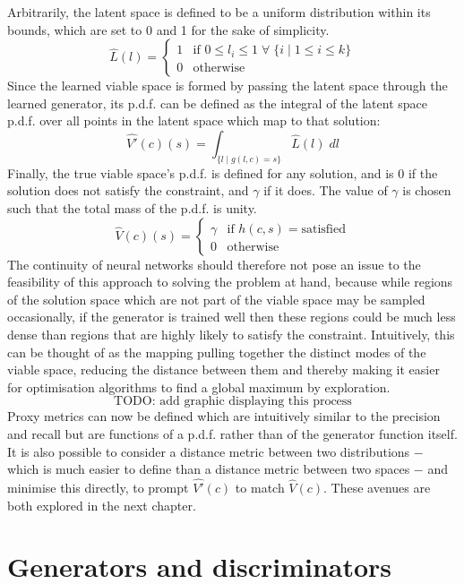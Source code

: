 \documentclass[../../main.tex]{subfiles}
\begin{document}
Arbitrarily, the latent space is defined to be a uniform distribution within its bounds, which are set to 0 and 1 for the sake of simplicity.
$$\hat{L}(l) =
\left\{
	\begin{array}{ll}
		1  & \mbox{if } 0 \le l_i \le 1 \; \forall \; \{i \; | \; 1 \le i \le k\} \\
		0 & \mbox{otherwise}
	\end{array}
\right.$$
Since the learned viable space is formed by passing the latent space through the learned generator, its p.d.f. can be defined as the integral of the latent space p.d.f. over all points in the latent space which map to that solution:
$$\hat{V'}(c)(s) = \int_{\{l \; | \; g(l,c) = s\}} \hat{L}(l) \; dl$$
Finally, the true viable space's p.d.f. is defined for any solution, and is $0$ if the solution does not satisfy the constraint, and $\gamma$ if it does.
The value of $\gamma$ is chosen such that the total mass of the p.d.f. is unity.
$$\hat{V}(c)(s) =
\left\{
	\begin{array}{ll}
		\gamma & \mbox{if } h(c,s) = \text{satisfied} \\
		0 & \mbox{otherwise}
	\end{array}
\right.$$
The continuity of neural networks should therefore not pose an issue to the feasibility of this approach to solving the problem at hand, because while regions of the solution space which are not part of the viable space may be sampled occasionally, if the generator is trained well then these regions could be much less dense than regions that are highly likely to satisfy the constraint.
Intuitively, this can be thought of as the mapping pulling together the distinct modes of the viable space, reducing the distance between them and thereby making it easier for optimisation algorithms to find a global maximum by exploration.
$$\text{TODO: add graphic displaying this process}$$
Proxy metrics can now be defined which are intuitively similar to the precision and recall but are functions of a p.d.f. rather than of the generator function itself.
It is also possible to consider a distance metric between two distributions $-$ which is much easier to define than a distance metric between two spaces $-$ and minimise this directly, to prompt $\hat{V'}(c)$ to match $\hat{V}(c)$.
These avenues are both explored in the next chapter.

\section{Generators and discriminators}
\end{document}
